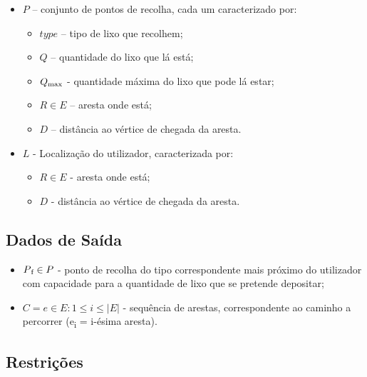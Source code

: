 \documentclass[article, a4paper, 12pt, oneside]{memoir}
\begin{document}
\begin{itemize}
\begin{itemize}
	\end{itemize} %

\item $P$ – conjunto de pontos de recolha, cada um caracterizado por:

	\begin{itemize} %

	\item $type$ – tipo de lixo que recolhem;
	\item $Q$ – quantidade do lixo que lá está;
	\item $Q \textsubscript{max}$ - quantidade máxima do lixo que pode lá estar;
	\item $R \in E$ – aresta onde está;
	\item $D$ – distância ao vértice de chegada da aresta.

	\end{itemize} %

\item $L$ - Localização do utilizador, caracterizada por:
	
	\begin{itemize}
	
	\item $R \in E$ - aresta onde está;
	\item $D$ - distância ao vértice de chegada da aresta.
	
	\end{itemize}

\end{itemize} %

\subsection{Dados de Saída}

\begin{itemize}
\item $P\textsubscript{f} \in P$ - ponto de recolha do tipo correspondente mais próximo do utilizador com capacidade para a quantidade de lixo que se pretende depositar;
\item $C = {e \in E: 1 \leq i \leq |E|}$ - sequência de arestas, correspondente ao caminho a percorrer (e\textsubscript{i} = i-ésima aresta).
\end{itemize}


\subsection{Restrições}
\end{document}
